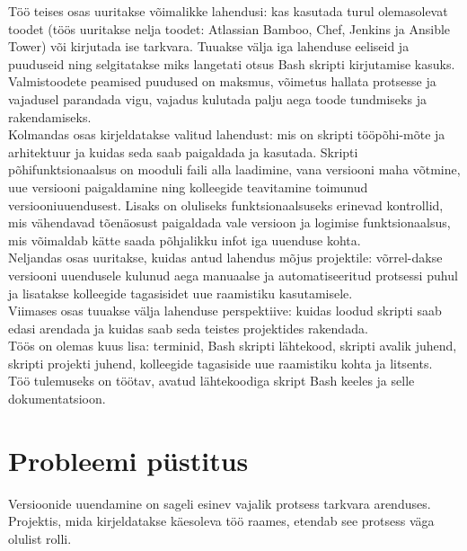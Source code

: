 \documentclass[12pt]{report}
\begin{document}
  Töö teises osas uuritakse võimalikke lahendusi: kas kasutada turul olemasolevat toodet (töös uuritakse nelja toodet: Atlassian Bamboo, Chef, Jenkins ja Ansible Tower) või kirjutada ise tarkvara. Tuuakse välja iga lahenduse eeliseid ja puuduseid ning selgitatakse miks langetati otsus Bash skripti kirjutamise kasuks. Valmistoodete peamised puudused on maksmus, võimetus hallata protsesse ja vajadusel parandada vigu, vajadus kulutada palju aega toode tundmiseks ja rakendamiseks.\\
  
  Kolmandas osas kirjeldatakse valitud lahendust: mis on skripti tööpõhi-mõte ja arhitektuur ja kuidas seda saab paigaldada ja kasutada. Skripti põhifunktsionaalsus on mooduli faili alla laadimine, vana versiooni maha võtmine, uue versiooni paigaldamine ning kolleegide teavitamine toimunud versiooniuuendusest. Lisaks on oluliseks funktsionaalsuseks erinevad kontrollid, mis vähendavad tõenäosust paigaldada vale versioon ja logimise funktsionaalsus, mis võimaldab kätte saada põhjalikku infot iga uuenduse kohta.\\
  
  Neljandas osas uuritakse, kuidas antud lahendus mõjus projektile: võrrel-dakse versiooni uuendusele kulunud aega manuaalse ja automatiseeritud protsessi puhul ja lisatakse kolleegide tagasisidet uue raamistiku kasutamisele.\\
  
  Viimases osas tuuakse välja lahenduse perspektiive: kuidas loodud skripti saab edasi arendada ja kuidas saab seda teistes projektides rakendada.\\
  
  Töös on olemas kuus lisa: terminid, Bash skripti lähtekood, skripti avalik juhend, skripti projekti juhend, kolleegide tagasiside uue raamistiku kohta ja litsents.\\
  
  Töö tulemuseks on töötav, avatud lähtekoodiga skript Bash keeles ja selle dokumentatsioon.
  
  \newpage
  
  \section{Probleemi püstitus}
  
  Versioonide uuendamine on sageli esinev vajalik protsess tarkvara arenduses. Projektis, mida kirjeldatakse käesoleva töö raames, etendab see protsess väga olulist rolli.\\
  
\end{document}
